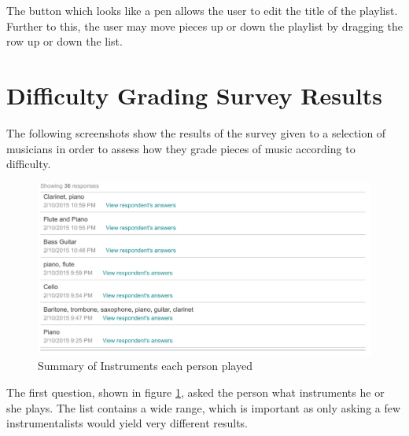\begin{appendices}
The button which looks like a pen allows the user to edit the title of the playlist. Further to this, the user may move pieces up or down the playlist by dragging the row up or down the list.

\section{Difficulty Grading Survey Results}
The following screenshots show the results of the survey given to a selection of musicians in order to assess how they grade pieces of music according to difficulty.
\begin{figure}[H]
\centering
\includegraphics[width=\textwidth]{survey_results/instruments}
\caption{Summary of Instruments each person played}	
\label{fig:instruments}
\end{figure}
The first question, shown in figure \ref{fig:instruments}, asked the person what instruments he or she plays. The list contains a wide range, which is important as only asking a few instrumentalists would yield very different results.


\end{appendices}
